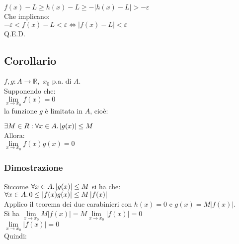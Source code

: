 \documentclass[a4paper, twoside, italian, 11pt]{book}
\newcommand{\abs}[1] {\left | #1 \right |}
\newcommand{\R}{\mathbb{R}}
\begin{document}
$f(x) - L \geq h(x) - L \geq -\abs{h(x) - L} > -\varepsilon$ \\

\noindent
Che implicano: \\

$-\varepsilon < f(x) - L < \varepsilon \iff \abs{f(x) - L} < \varepsilon$ \\

\noindent
Q.E.D.


\subsection{Corollario}

\noindent
$f, g : A \rightarrow \R,$ $x_0$ p.a. di $A$. \\

\noindent
Supponendo che: \\

$\lim\limits_{x \to x_0} f(x) = 0$ \\

la funzione $g$ è limitata in $A$, cioè:

$\exists M \in R : \forall x \in A \ldotp \abs{g(x)} \leq M$ \\

\noindent
Allora: \\

$\lim\limits_{x \to x_0} f(x) g(x) = 0$


\subsubsection{Dimostrazione}

\noindent
Siccome $\forall x \in A \ldotp \abs{g(x)} \leq M$ si ha che: \\

$\forall x \in A \ldotp 0 \leq \abs{f(x)g(x)} \leq M \abs{f(x)}$ \\

\noindent
Applico il teorema dei due carabinieri con $h(x) = 0$ e $g(x) = M \abs{f(x)}$. \\

\noindent
Si ha $\lim\limits_{x \to x_0} M \abs{f(x)} = M \lim\limits_{x \to x_0} \abs{f(x)} = 0$ \\

\noindent
$\lim\limits_{x \to x_0} \abs{f(x)} = 0$ \\

\noindent
Quindi: \\
\end{document}
